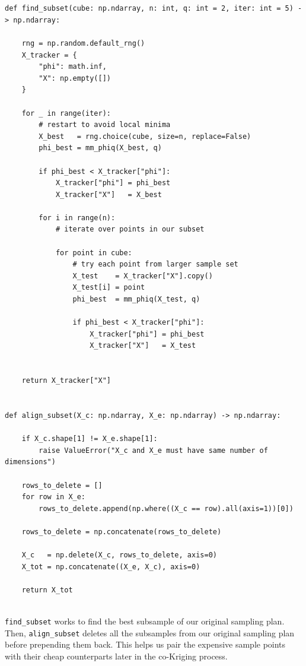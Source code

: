 \documentclass[11pt]{article}
\newcommand{\subentry}[1]{\subsection{#1}}
\theoremstyle{definition}
\begin{document}
\begin{lstlisting}


def find_subset(cube: np.ndarray, n: int, q: int = 2, iter: int = 5) -> np.ndarray:

    rng = np.random.default_rng()
    X_tracker = {
        "phi": math.inf,
        "X": np.empty([])
    }

    for _ in range(iter):
        # restart to avoid local minima
        X_best   = rng.choice(cube, size=n, replace=False)
        phi_best = mm_phiq(X_best, q)

        if phi_best < X_tracker["phi"]:
            X_tracker["phi"] = phi_best
            X_tracker["X"]   = X_best

        for i in range(n):
            # iterate over points in our subset
            
            for point in cube:
                # try each point from larger sample set
                X_test    = X_tracker["X"].copy()
                X_test[i] = point
                phi_best  = mm_phiq(X_test, q)

                if phi_best < X_tracker["phi"]:
                    X_tracker["phi"] = phi_best
                    X_tracker["X"]   = X_test

        
    return X_tracker["X"]


def align_subset(X_c: np.ndarray, X_e: np.ndarray) -> np.ndarray:

    if X_c.shape[1] != X_e.shape[1]:
        raise ValueError("X_c and X_e must have same number of dimensions")
    
    rows_to_delete = []
    for row in X_e:
        rows_to_delete.append(np.where((X_c == row).all(axis=1))[0])

    rows_to_delete = np.concatenate(rows_to_delete)
    
    X_c   = np.delete(X_c, rows_to_delete, axis=0)
    X_tot = np.concatenate((X_e, X_c), axis=0)

    return X_tot
    
\end{lstlisting}

 \texttt{find\_subset} works to find the best subsample of our original sampling plan. Then, \texttt{align\_subset} deletes all the
subsamples from our original sampling plan before prepending them back. This helps us pair the expensive
sample points with their cheap counterparts later in the co-Kriging process.

\end{document}
